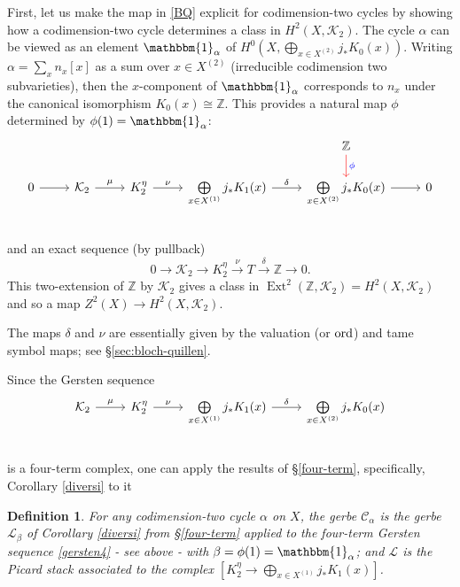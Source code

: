 \documentclass{amsart}
\numberwithin{equation}{subsection}
\newtheorem{definition}[theorem]{Definition}
\theoremstyle{remark}
\theoremstyle{remark}
\newcommand{\too}{\longrightarrow}%
\newcommand{\cC}{\mathcal{C}}
\newcommand{\cK}{\mathcal{K}}
\newcommand{\cL}{\mathcal{L}}
\newcommand{\bbZ}{\mathbb{Z}}
\newcommand{\bbone}{\mathbbm{1}}
\DeclareMathOperator{\Ext}{Ext}
\begin{document}
First, let us make the map in \eqref{BQ} explicit for codimension-two cycles by showing how a codimension-two cycle determines a class in $H^2(X, \cK_2)$.   The cycle $\alpha$ can be viewed as an element $\bbone_{\alpha}$ of $H^0(X, \bigoplus\limits_{x \in X^{(2)}} j_* K_0(x))$.  Writing $\alpha = \sum_x n_x [x]$ as a sum over  $x\in X^{(2)}$ (irreducible codimension two subvarieties), then the $x$-component of $\bbone_{\alpha}$ corresponds to $n_x$ under the canonical isomorphism $K_0(x) \cong \bbZ$.  This provides a natural map $\phi$ determined by $\phi(1) = {\bbone}_{\alpha}$:
  \begin{equation}\label{gersten4}
    \begin{tikzcd}
      &&&& {\bbZ} \arrow[d, red, "\phi" blue] \\
      0 \arrow[r] &\cK_2 \arrow[r, "\mu"] &  K_2^{\eta} \arrow[r, "\nu"] & {\bigoplus\limits_{x \in X^{(1)}} j_* K_1(x)} \arrow[r, "{\delta}"]  &\bigoplus\limits_{x \in X^{(2)}} j_* K_0(x) \arrow[r] & 0\\
    \end{tikzcd}
  \end{equation}
and an exact sequence (by pullback)
\begin{equation}\label{TEE}
  0 \too \cK_2 \too K_2^{\eta} \overset{\nu}{\too} T \overset{\delta}{\too} \bbZ \too 0.
\end{equation} 
This two-extension of $\bbZ$ by $\cK_2$ gives a class in $\Ext^2(\bbZ,\cK_2) = H^2(X, \cK_2)$ and so a map $Z^2(X) \to H^2(X, \cK_2)$.
  
 The maps $\delta$ and $\nu$ are essentially given by the valuation (or ${\rm ord}$) and tame symbol maps; see \S \ref{sec:bloch-quillen}. 

Since the Gersten sequence
\begin{equation*}
  \begin{tikzcd}
      \cK_2 \arrow[r, "\mu"] &  K_2^{\eta} \arrow[r, "\nu"] & {\bigoplus\limits_{x \in X^{(1)}} j_* K_1(x)} \arrow[r, "{\delta}"]  &\bigoplus\limits_{x \in X^{(2)}} j_* K_0(x)\\
    \end{tikzcd}
\end{equation*}
is a four-term complex, one can apply the results of \S \ref{four-term}, specifically, Corollary \ref{diversi} to it
\begin{definition}
  For any codimension-two cycle $\alpha$ on $X$, the gerbe $\cC_{\alpha}$ is the gerbe $\cL_{\beta}$ of Corollary \ref{diversi} from \S \ref{four-term} applied to the four-term Gersten sequence  \eqref{gersten4} - see above - with $\beta=\phi(1) = \bbone_{\alpha}$; and $\cL$ is the Picard stack associated to the complex $[K_2^{\eta}\to \bigoplus\limits_{x \in X^{(1)}} j_* K_1(x)]$.
\end{definition}
\end{document}
